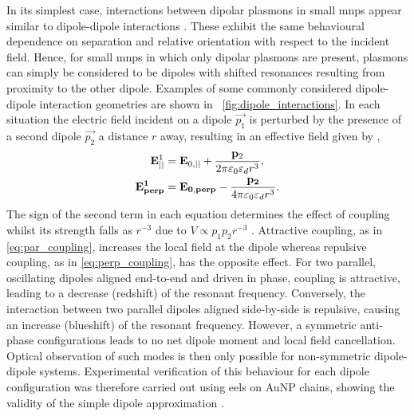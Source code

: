 \documentclass{article}
\begin{document}
In its simplest case, interactions between dipolar plasmons in small \glspl{mnp} appear similar to dipole-dipole interactions \cite{kreibig1995optical, maier2002, gluodenis2002, rechberger2003, atay2004}. These exhibit the same behavioural dependence on separation and relative orientation with respect to the incident field. Hence, for small \glspl{mnp} in which only dipolar plasmons are present, plasmons can simply be considered to be dipoles with shifted resonances resulting from proximity to the other dipole. Examples of some commonly considered dipole-dipole interaction geometries are shown in \figurename~\ref{fig:dipole_interactions}. In each situation the electric field incident on a dipole $\vec{p_1}$ is perturbed by the presence of a second dipole $\vec{p_2}$ a distance $r$ away, resulting in an effective field given by \cite{},
\begin{subequations}
\begin{align}
	\mathbf{E}_{||}^1 &= \mathbf{E}_{0,||} + \frac{\mathbf{p}_2}{2\pi\varepsilon_0\varepsilon_d r^3}, \label{eq:par_coupling} \\
	\mathbf{E_{perp}^1} &= \mathbf{E_{0,perp}} - \frac{\mathbf{p_2}}{4\pi\varepsilon_0\varepsilon_d r^3}. \label{eq:perp_coupling}
\end{align}
\end{subequations}
The sign of the second term in each equation determines the effect of coupling whilst its strength falls as $r^{-3}$ due to $V \propto p_1p_2r^{-3}$ \cite{halas2011}. Attractive coupling, as in \eqref{eq:par_coupling}, increases the local field at the dipole whereas repulsive coupling, as in \eqref{eq:perp_coupling}, has the opposite effect.
For two parallel, oscillating dipoles aligned end-to-end and driven in phase, coupling is attractive, leading to a decrease (redshift) of the resonant frequency. Conversely, the interaction between two parallel dipoles aligned side-by-side is repulsive, causing an increase (blueshift) of the resonant frequency. However, a symmetric anti-phase configurations leads to no net dipole moment and local field cancellation. Optical observation of such modes is then only possible for non-symmetric dipole-dipole systems. Experimental verification of this behaviour for each dipole configuration was therefore carried out using \gls{eels} on AuNP chains, showing the validity of the simple dipole approximation \cite{maier2002}.
\end{document}
